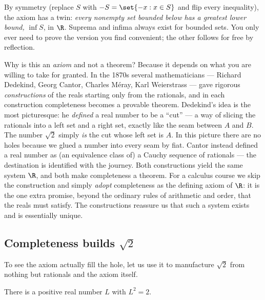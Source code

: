 \begin{remark}
By symmetry (replace $S$ with $-S = \set{-x : x\in S}$ and flip every inequality), the
axiom has a twin: \emph{every nonempty set bounded below has a greatest lower bound,}
$\inf S$, in $\R$. Suprema and infima always exist for bounded sets. You only ever need to
prove the version you find convenient; the other follows for free by reflection.
\end{remark}

\begin{historybox}
Why is this an \emph{axiom} and not a theorem? Because it depends on what you are willing
to take for granted. In the 1870s several mathematicians --- Richard Dedekind, Georg
Cantor, Charles M\'eray, Karl Weierstrass --- gave rigorous \emph{constructions} of the
reals starting only from the rationals, and in each construction completeness becomes a
provable theorem. Dedekind's idea is the most picturesque: he \emph{defined} a real number
to be a ``cut'' --- a way of slicing the rationals into a left set and a right set, exactly
like the seam between $A$ and $B$. The number $\sqrt 2$ simply \emph{is} the cut whose left
set is $A$. In this picture there are no holes because we glued a number into every seam by
fiat. Cantor instead defined a real number as (an equivalence class of) a Cauchy sequence
of rationals --- the destination is identified with the journey. Both constructions yield
the same system $\R$, and both make completeness a theorem. For a calculus course we skip
the construction and simply \emph{adopt} completeness as the defining axiom of $\R$: it is
the one extra promise, beyond the ordinary rules of arithmetic and order, that the reals
must satisfy. The constructions reassure us that such a system exists and is essentially
unique.
\end{historybox}

\subsection*{Completeness builds $\sqrt 2$}

To see the axiom actually fill the hole, let us use it to manufacture $\sqrt 2$ from
nothing but rationals and the axiom itself.

\begin{theorem}
\label{ch41:sqrt-exists}
There is a positive real number $L$ with $L^2 = 2$.
\end{theorem}

